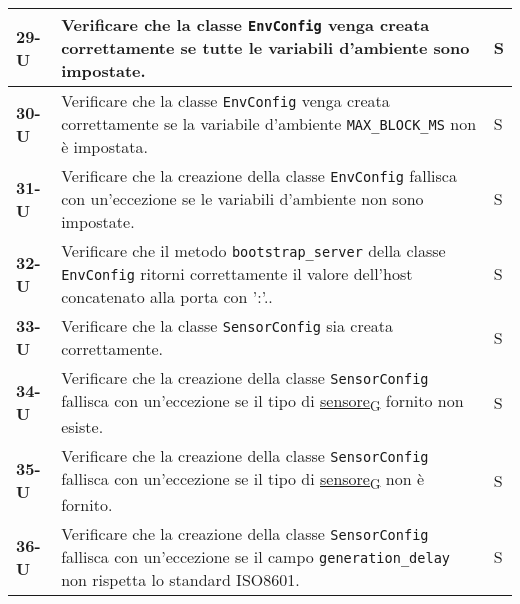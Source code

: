\begin{longtable}{|>{\raggedright\arraybackslash}m{}|>{\raggedright\arraybackslash}m{}|>{\raggedright\arraybackslash}m{}|}
	\hline
	\textbf{29-U}   & Verificare che la classe \texttt{EnvConfig} venga creata correttamente se tutte le variabili d'ambiente sono impostate.                                                                                                                          & S              \\
	\hline
	\textbf{30-U}   & Verificare che la classe \texttt{EnvConfig} venga creata correttamente se la variabile d'ambiente \texttt{MAX\_BLOCK\_MS} non è impostata.                                                                                                       & S              \\
	\hline
	\textbf{31-U}   & Verificare che la creazione della classe \texttt{EnvConfig} fallisca con un'eccezione se le variabili d'ambiente non sono impostate.                                                                                                             & S              \\
	\hline
	\textbf{32-U}   & Verificare che il metodo \texttt{bootstrap\_server} della classe \texttt{EnvConfig} ritorni correttamente il valore dell'host concatenato alla porta con ':'..                                                                                   & S              \\
	\hline
	\textbf{33-U}   & Verificare che la classe \texttt{SensorConfig} sia creata correttamente.                                                                                                                                                                         & S              \\
	\hline
	\textbf{34-U}   & Verificare che la creazione della classe \texttt{SensorConfig} fallisca con un'eccezione se il tipo di \href{https://7last.github.io/docs/rtb/documentazione-interna/glossario\#sensore}{sensore\textsubscript{G}} fornito non esiste.           & S              \\
	\hline
	\textbf{35-U}   & Verificare che la creazione della classe \texttt{SensorConfig} fallisca con un'eccezione se il tipo di \href{https://7last.github.io/docs/rtb/documentazione-interna/glossario\#sensore}{sensore\textsubscript{G}} non è fornito.                & S              \\
	\hline
	\textbf{36-U}   & Verificare che la creazione della classe \texttt{SensorConfig} fallisca con un'eccezione se il campo \texttt{generation\_delay} non rispetta lo standard ISO8601.                                                                                & S              \\

\end{longtable}
